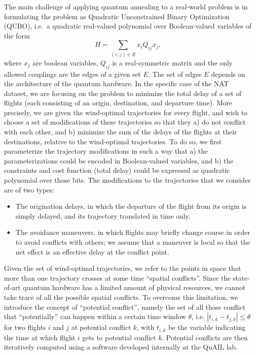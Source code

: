 \documentclass[twocolumn,9pt]{article}
\begin{document}
The main challenge of applying quantum annealing to a real-world problem is in formulating
the problem as Quadratic Unconstrained Binary Optimization (QUBO), i.e.\ a quadratic real-valued
polynomial over Boolean-valued variables of the form
$$
    H = \sum_{(i,\,j)\in E} x_i Q_{ij} x_j,
$$
where $x_j$ are boolean variables, $Q_{ij}$ is a real-symmetric matrix and the only allowed couplings
are the edges of a given set $E$. The set of edges $E$ depends on the architecture of the quantum hardware.
%
In the specific case of the NAT dataset, we are focusing on the problem to minimize the total delay 
of a set of flights (each consisting of an origin, destination, and departure time).
More precisely, we are given the wind-optimal trajectories for every flight, 
and wish to choose a set of modifications of these trajectories so that they a) do not conflict
with each other, and b) minimize the sum of the delays of the flights at their destinations,
relative to the wind-optimal trajectories.
%
To do so, we first parameterize the trajectory modifications in such a way that a) the parameterizations
could be encoded in Boolean-valued variables, and b) the constraints and cost function
(total delay) could be expressed as quadratic polynomial over those bits.
The modifications to the trajectories that we consider are of two types:
\begin{itemize}
    \item The origination delays, in which the departure of the flight from its origin is
          simply delayed, and its trajectory translated in time only. 
    \item The avoidance maneuvers, in which flights may briefly change course in order to avoid
          conflicts with others; we assume that a maneuver is local so that the net effect is an
          effective delay at the conflict point.
\end{itemize}
%
Given the set of wind-optimal trajectories, we refer to the points in space that more than one trajectory 
crosses at some time ``spatial conflicts''. Since the state-of-art quantum hardware has a limited amount of
physical resources, we cannot take trace of all the possible spatial conflicts. 
To overcome this limitation, we introduce the concept of ``potential conflict'', namely the set
of all those conflict that ``potentially'' can happen within a certain time window $\theta$,
i.e. $|t_{i,k} - t_{j,k}| \leq \theta$ for two flights $i$ and $j$ at potential conflict $k$,
with $t_{i,k}$ be the variable indicating the time at which flight $i$ gets to potential conflict $k$.
Potential conflicts are then iteratively computed using a software developed internally at the QuAIL lab.
\end{document}
